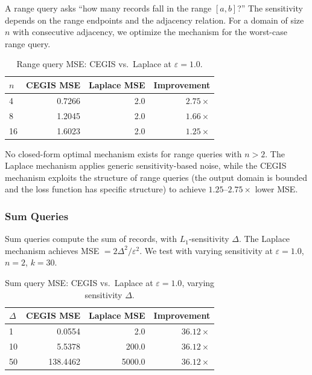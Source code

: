 \documentclass[11pt,a4paper]{article}
\newcommand{\eps}{\varepsilon}
\begin{document}
A range query asks ``how many records fall in the range $[a, b]$?''  The
sensitivity depends on the range endpoints and the adjacency relation.  For
a domain of size $n$ with consecutive adjacency, we optimize the mechanism
for the worst-case range query.

\begin{table}[t]
\centering
\caption{Range query MSE: CEGIS vs.\ Laplace at $\eps = 1.0$.}
\label{tab:range}
\begin{tabular}{@{}lrrr@{}}
\toprule
$n$ & CEGIS MSE & Laplace MSE & Improvement \\
\midrule
4   & 0.7266 & 2.0 & $2.75\times$ \\
8   & 1.2045 & 2.0 & $1.66\times$ \\
16  & 1.6023 & 2.0 & $1.25\times$ \\
\bottomrule
\end{tabular}
\end{table}

No closed-form optimal mechanism exists for range queries with $n > 2$.  The
Laplace mechanism applies generic sensitivity-based noise, while the CEGIS
mechanism exploits the structure of range queries (the output domain is bounded
and the loss function has specific structure) to achieve $1.25$--$2.75\times$
lower MSE.

\subsubsection{Sum Queries}

Sum queries compute the sum of records, with $L_1$-sensitivity $\Delta$.  The
Laplace mechanism achieves MSE $= 2\Delta^2/\eps^2$.  We test with varying
sensitivity at $\eps = 1.0$, $n = 2$, $k = 30$.

\begin{table}[t]
\centering
\caption{Sum query MSE: CEGIS vs.\ Laplace at $\eps = 1.0$, varying sensitivity $\Delta$.}
\label{tab:sum}
\begin{tabular}{@{}lrrr@{}}
\toprule
$\Delta$ & CEGIS MSE & Laplace MSE & Improvement \\
\midrule
1   & 0.0554   & 2.0       & $36.12\times$ \\
10  & 5.5378   & 200.0     & $36.12\times$ \\
50  & 138.4462 & 5000.0    & $36.12\times$ \\
\bottomrule
\end{tabular}
\end{table}
\end{document}
